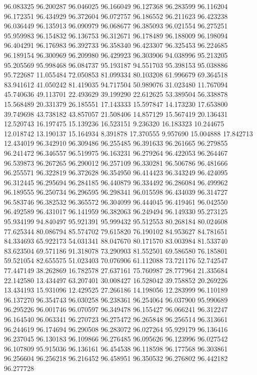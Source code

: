 96.083325
96.200287
96.046025
96.166049
96.127368
96.283599
96.116204
96.172351
96.434929
96.372604
96.072757
96.186552
96.211623
96.423238
96.036449
96.135913
96.090979
96.068677
96.385093
96.021554
96.275251
95.959983
96.154832
96.136753
96.312671
96.178489
96.188009
96.198094
96.404291
96.176983
96.392733
96.358340
96.423307
96.325453
96.224685
96.189154
96.300969
96.209980
96.429923
96.303906
94.038996
95.213205
95.205569
95.998468
96.084737
95.193187
94.551703
95.398153
95.038886
95.722687
11.055484
72.050853
81.099334
80.103208
61.996679
69.364518
83.941612
41.050242
81.419035
94.717504
50.989076
31.023480
11.767094
45.740636
49.113701
22.493629
39.199290
22.612625
53.389504
56.338878
15.568489
20.331379
26.185551
17.143333
15.597847
14.173230
17.653800
39.749698
43.738182
43.857057
21.508406
14.857129
15.567419
20.136431
12.520743
16.197475
15.139236
16.523151
9.236320
16.183323
10.244675
12.018742
13.190137
15.164934
8.391878
17.370555
9.957690
15.004888
17.842713
12.434019
96.342910
96.309486
96.255485
96.391633
96.261665
96.279855
96.241472
96.346557
96.519975
96.163231
96.279264
96.422053
96.264467
96.539873
96.267265
96.290012
96.257109
96.330281
96.506786
96.481666
96.255571
96.322819
96.372628
96.354950
96.414423
96.343249
96.424095
96.312445
96.295694
96.284185
96.440879
96.334492
96.286084
96.499962
96.189555
96.250734
96.296595
96.298341
96.015598
96.434039
96.314727
96.583746
96.382532
96.365572
96.304099
96.444045
96.419461
96.042550
96.492589
96.431017
96.141959
96.382063
96.249494
96.149330
95.273125
95.934199
94.840497
95.921391
95.999432
95.512553
80.268184
80.024608
77.625344
80.086794
85.574702
79.615820
76.190102
84.953627
84.781651
84.334693
65.922173
54.031341
88.047670
80.171570
83.003984
81.533740
83.623504
69.571186
91.318078
73.290903
81.552501
69.586580
76.185801
59.521054
82.655575
51.023403
70.076906
61.112088
73.721176
52.742547
77.447149
38.262869
16.782578
27.637161
75.760987
28.777964
21.335684
22.142580
13.434497
63.207401
30.008427
16.528042
39.758852
20.269226
13.434193
15.931096
12.429525
27.266186
14.198056
12.283999
96.110189
96.137270
96.354743
96.030258
96.238361
96.254064
96.037900
95.990689
96.295226
96.001746
96.070597
96.349478
96.155427
96.066241
96.312247
96.164540
96.063341
96.270723
96.275472
96.265848
96.256514
96.313661
96.244619
96.174694
96.290508
96.283072
96.027264
95.929179
96.136416
96.237045
96.130183
96.109866
96.276485
96.095626
96.123996
96.027542
96.107809
95.915036
96.136161
96.454538
96.118598
96.177568
96.303861
96.256604
96.256218
96.216452
96.458951
96.350532
96.276802
96.442182
96.277728
